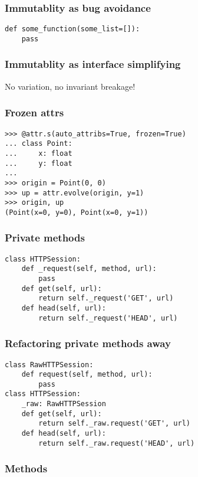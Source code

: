 \begin{frame}[fragile]
\frametitle{Immutablity as bug avoidance}

\begin{lstlisting}
def some_function(some_list=[]):
    pass
\end{lstlisting}

\end{frame}

\begin{frame}[fragile]
\frametitle{Immutablity as interface simplifying}

No variation, no invariant breakage!
\end{frame}

\begin{frame}[fragile]
\frametitle{Frozen attrs}

\begin{lstlisting}
>>> @attr.s(auto_attribs=True, frozen=True)
... class Point:
...     x: float
...     y: float
... 
>>> origin = Point(0, 0)
>>> up = attr.evolve(origin, y=1)
>>> origin, up
(Point(x=0, y=0), Point(x=0, y=1))
\end{lstlisting}

\end{frame}

\begin{frame}[fragile]
\frametitle{Private methods}

\begin{lstlisting}
class HTTPSession:
    def _request(self, method, url):
        pass
    def get(self, url):
        return self._request('GET', url)
    def head(self, url):
        return self._request('HEAD', url)
\end{lstlisting}
    
\end{frame}

\begin{frame}[fragile]
\frametitle{Refactoring private methods away}

\begin{lstlisting}
class RawHTTPSession:
    def request(self, method, url):
        pass
class HTTPSession:
    _raw: RawHTTPSession
    def get(self, url):
        return self._raw.request('GET', url)
    def head(self, url):
        return self._raw.request('HEAD', url)
\end{lstlisting}
    
\end{frame}

\begin{frame}[fragile]
\frametitle{Methods}
\end{frame}

